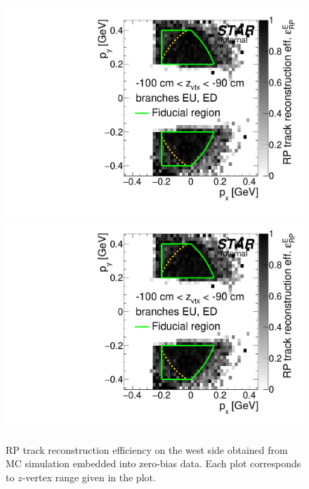 \begin{figure}[hb]
\caption[RP track reconstruction efficiency on the west (MC embedded into zero-bias data).]{RP track reconstruction efficiency on the west side obtained from MC simulation embedded into zero-bias data. Each plot corresponds to $z$-vertex range given in the plot.}\label{fig:rpEffE}
\centering
\parbox{0.495\textwidth}{
  \centering
  \includegraphics[width=\linewidth,page=23]{graphics/corrections/mcFullEffPxPy.pdf}\\
  \includegraphics[width=\linewidth,page=25]{graphics/corrections/mcFullEffPxPy.pdf}\\
}
\end{figure}
